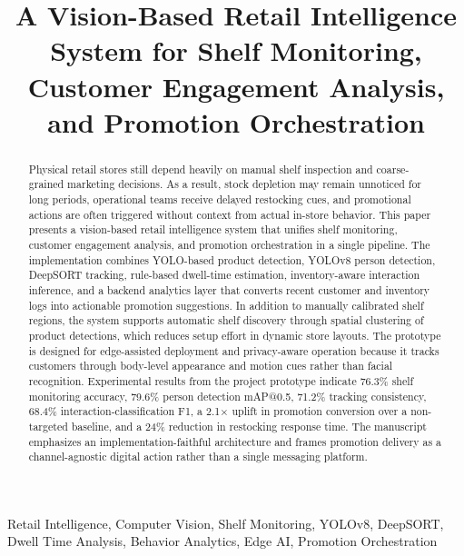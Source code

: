 \documentclass[conference]{IEEEtran}
\begin{document}
\title{A Vision-Based Retail Intelligence System for Shelf Monitoring, Customer Engagement Analysis, and Promotion Orchestration}

\author{
}

\maketitle

\begin{abstract}
Physical retail stores still depend heavily on manual shelf inspection and coarse-grained marketing decisions. As a result, stock depletion may remain unnoticed for long periods, operational teams receive delayed restocking cues, and promotional actions are often triggered without context from actual in-store behavior. This paper presents a vision-based retail intelligence system that unifies shelf monitoring, customer engagement analysis, and promotion orchestration in a single pipeline. The implementation combines YOLO-based product detection, YOLOv8 person detection, DeepSORT tracking, rule-based dwell-time estimation, inventory-aware interaction inference, and a backend analytics layer that converts recent customer and inventory logs into actionable promotion suggestions. In addition to manually calibrated shelf regions, the system supports automatic shelf discovery through spatial clustering of product detections, which reduces setup effort in dynamic store layouts. The prototype is designed for edge-assisted deployment and privacy-aware operation because it tracks customers through body-level appearance and motion cues rather than facial recognition. Experimental results from the project prototype indicate 76.3\% shelf monitoring accuracy, 79.6\% person detection mAP@0.5, 71.2\% tracking consistency, 68.4\% interaction-classification F1, a 2.1$\times$ uplift in promotion conversion over a non-targeted baseline, and a 24\% reduction in restocking response time. The manuscript emphasizes an implementation-faithful architecture and frames promotion delivery as a channel-agnostic digital action rather than a single messaging platform.
\end{abstract}

\begin{IEEEkeywords}
Retail Intelligence, Computer Vision, Shelf Monitoring, YOLOv8, DeepSORT, Dwell Time Analysis, Behavior Analytics, Edge AI, Promotion Orchestration
\end{IEEEkeywords}
\end{document}
